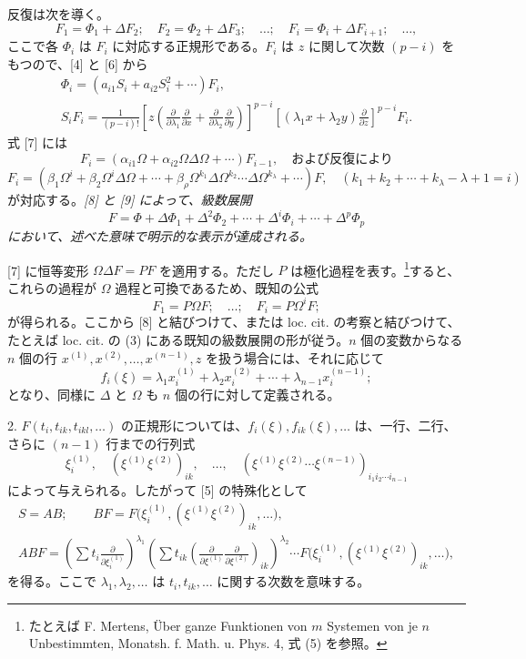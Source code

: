 \documentclass[11pt]{article}
\providecommand{\p}{\partial}
\begin{document}
反復は次を導く。
\[
        F_1=\Phi_1+\Delta F_2;\quad F_2=\Phi_2+\Delta F_3;\quad\ldots;\quad
        F_i=\Phi_i+\Delta F_{i+1};\quad\ldots,
\]
ここで各 \(\Phi_i\) は \(F_i\) に対応する正規形である。\(F_i\) は \(z\) に関して次数 \((p-i)\) をもつので、[4] と [6] から
\begin{equation}
\begin{gathered}
        \Phi_i=(a_{i1}S_i+a_{i2}S_i^2+\cdots)F_i,\\
        S_iF_i=\frac1{(p-i)!}
        \left[z\left(\frac{\p}{\p\lambda_1}\frac{\p}{\p x}+
        \frac{\p}{\p\lambda_2}\frac{\p}{\p y}\right)\right]^{p-i}
        \left[(\lambda_1x+\lambda_2y)\frac{\p}{\p z}\right]^{p-i}F_i.
\end{gathered}
\tag{8}
\end{equation}
式 [7] には
\[
        F_i=(\alpha_{i1}\Omega+\alpha_{i2}\Omega\Delta\Omega+\cdots)F_{i-1},
        \quad\text{および反復により}
\]
\begin{equation}
        F_i=(\beta_1\Omega^i+\beta_2\Omega^i\Delta\Omega+\cdots
        +\beta_\rho\Omega^{k_1}\Delta\Omega^{k_2}\cdots\Delta\Omega^{k_\lambda}+\cdots)F,
        \quad(k_1+k_2+\cdots+k_\lambda-\lambda+1=i)
\tag{9}
\end{equation}
が対応する。\emph{[8] と [9] によって、級数展開}
\[
        F=\Phi+\Delta\Phi_1+\Delta^2\Phi_2+\cdots+\Delta^i\Phi_i+\cdots+\Delta^p\Phi_p
\]
\emph{において、述べた意味で明示的な表示が達成される。}

[7] に恒等変形 \(\Omega\Delta F=PF\) を適用する。ただし \(P\) は極化過程を表す。\footnote{たとえば F. Mertens, Über ganze Funktionen von \(m\) Systemen von je \(n\) Unbestimmten, Monatsh. f. Math. u. Phys. 4, 式 (5) を参照。}すると、これらの過程が \(\Omega\) 過程と可換であるため、既知の公式
\[
        F_1=P\Omega F;\quad\ldots;\quad F_i=P\Omega^iF;
\]
が得られる。ここから [8] と結びつけて、または loc. cit. の考察と結びつけて、たとえば loc. cit. の (3) にある既知の級数展開の形が従う。\(n\) 個の変数からなる \(n\) 個の行 \(x^{(1)},x^{(2)},\ldots,x^{(n-1)},z\) を扱う場合には、それに応じて
\[
        f_i(\xi)=\lambda_1x_i^{(1)}+\lambda_2x_i^{(2)}+\cdots+\lambda_{n-1}x_i^{(n-1)};
\]
となり、同様に \(\Delta\) と \(\Omega\) も \(n\) 個の行に対して定義される。

2. \(F(t_i,t_{ik},t_{ikl},\ldots)\) の正規形については、\(f_i(\xi),f_{ik}(\xi),\ldots\) は、一行、二行、さらに \((n-1)\) 行までの行列式
\[
        \xi_i^{(1)},\quad (\xi^{(1)}\xi^{(2)})_{ik},\quad\ldots,\quad
        (\xi^{(1)}\xi^{(2)}\cdots\xi^{(n-1)})_{i_1i_2\cdots i_{n-1}}
\]
によって与えられる。したがって [5] の特殊化として
\[
\begin{gathered}
        S=AB;\qquad
        BF=F\bigl(\xi_i^{(1)},(\xi^{(1)}\xi^{(2)})_{ik},\ldots\bigr),\\
        ABF=\left(\sum t_i\frac{\p}{\p\xi_i^{(1)}}\right)^{\lambda_1}
        \left(\sum t_{ik}\left(\frac{\p}{\p\xi^{(1)}}\frac{\p}{\p\xi^{(2)}}\right)_{ik}\right)^{\lambda_2}
        \cdots F\bigl(\xi_i^{(1)},(\xi^{(1)}\xi^{(2)})_{ik},\ldots\bigr),
\end{gathered}
\]
を得る。ここで \(\lambda_1,\lambda_2,\ldots\) は \(t_i,t_{ik},\ldots\) に関する次数を意味する。
\end{document}
